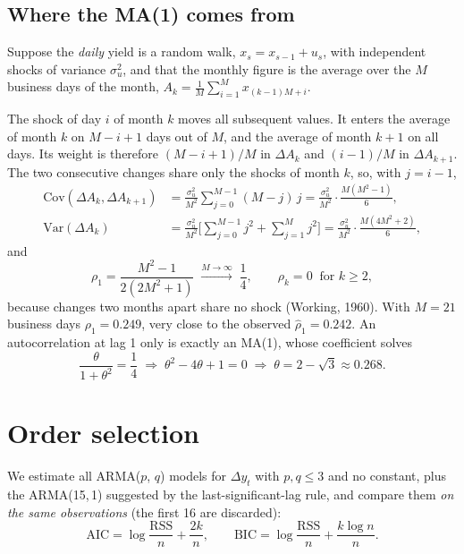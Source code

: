 \documentclass[11pt,a4paper]{article}
\begin{document}
\subsection{Where the MA(1) comes from}\label{sec:ma1}

Suppose the \emph{daily} yield is a random walk, $x_s = x_{s-1} + u_s$, with independent shocks of variance $\sigma_u^2$, and that the monthly figure is the average over the $M$ business days of the month, $A_k = \frac{1}{M}\sum_{i=1}^{M} x_{(k-1)M+i}$.

The shock of day $i$ of month $k$ moves all subsequent values. It enters the average of month $k$ on $M - i + 1$ days out of $M$, and the average of month $k+1$ on all days. Its weight is therefore $(M-i+1)/M$ in $\Delta A_k$ and $(i-1)/M$ in $\Delta A_{k+1}$. The two consecutive changes share only the shocks of month $k$, so, with $j = i - 1$,
\begin{align}
\mathrm{Cov}(\Delta A_k, \Delta A_{k+1}) &= \frac{\sigma_u^2}{M^2}\sum_{j=0}^{M-1}(M-j)\,j = \frac{\sigma_u^2}{M^2}\cdot\frac{M(M^2-1)}{6},\\
\mathrm{Var}(\Delta A_k) &= \frac{\sigma_u^2}{M^2}\Big[\sum_{j=0}^{M-1} j^2 + \sum_{j=1}^{M} j^2\Big] = \frac{\sigma_u^2}{M^2}\cdot\frac{M(4M^2+2)}{6},
\end{align}
and
\begin{equation}
\rho_1 = \frac{M^2-1}{2(2M^2+1)} \;\xrightarrow{M\to\infty}\; \frac14, \qquad \rho_k = 0 \ \text{ for } k \ge 2,
\end{equation}
because changes two months apart share no shock (Working, 1960). With $M = 21$ business days $\rho_1 = 0.249$, very close to the observed $\hat\rho_1 = 0.242$. An autocorrelation at lag 1 only is exactly an MA(1), whose coefficient solves
\begin{equation}
\frac{\theta}{1+\theta^2} = \frac14 \;\Longrightarrow\; \theta^2 - 4\theta + 1 = 0 \;\Longrightarrow\; \theta = 2 - \sqrt{3} \approx 0.268.
\end{equation}

\section{Order selection}

We estimate all ARMA($p$, $q$) models for $\Delta y_t$ with $p, q \le 3$ and no constant, plus the ARMA(15,\,1) suggested by the last-significant-lag rule, and compare them \emph{on the same observations} (the first 16 are discarded):
\begin{equation}
\mathrm{AIC} = \log\frac{\mathrm{RSS}}{n} + \frac{2k}{n}, \qquad \mathrm{BIC} = \log\frac{\mathrm{RSS}}{n} + \frac{k\log n}{n}.
\end{equation}
\end{document}
